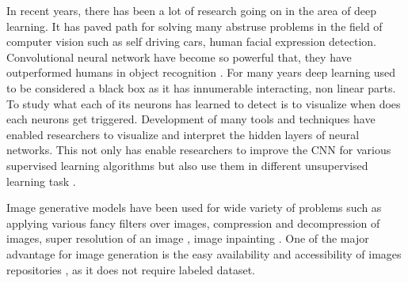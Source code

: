 
\doublespacing
{}
   
In recent years, there has been a lot of research going on in the area of deep learning. It has paved path for solving many abstruse problems in the field of computer vision such as self driving cars, human facial expression detection\cite{1612.02903}. Convolutional neural network have become so powerful that, they have outperformed humans in object recognition \cite{CNN-Better,krizhevsky2012imagenet,szegedy2015going,he2016deep,simonyan2014very}. For many years deep learning used to be considered a black box as it has innumerable interacting, non linear parts. To study what each of its neurons has learned to detect is to visualize when does each neurons get triggered. Development of many tools and techniques have enabled researchers to visualize and interpret the hidden layers of neural networks. This not only has enable researchers to improve the CNN for various supervised learning algorithms but also use them in different unsupervised learning task \cite{1506.06579}. 

\par

Image generative models have been used for wide variety of problems such as applying various fancy filters over images, compression and decompression of images, super resolution of an image \cite{1609.04802}, image inpainting \cite{1607.07539}.
 One of the major advantage for image generation is the easy availability and accessibility  of images repositories \cite{celeba} , as it does not require labeled dataset.

